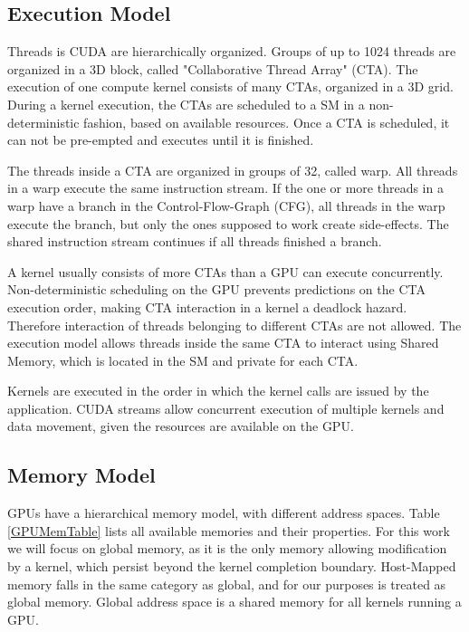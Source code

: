 \subsection{Execution Model}
Threads is CUDA are hierarchically organized. Groups of up to 1024 threads are organized in a 3D block, called "Collaborative Thread Array" (CTA). The execution of one compute kernel consists of many CTAs, organized in a 3D grid. During a kernel execution, the CTAs are  scheduled to a SM in a non-deterministic fashion, based on available resources. Once a CTA is scheduled, it can not be pre-empted and executes until it is finished.  \cite[2.1 - 2.2]{cuda-man}

The threads inside a CTA are organized in groups of 32, called warp. All threads in a warp execute the same instruction stream. If the one or more threads in a warp have a branch in the Control-Flow-Graph (CFG), all threads in the warp
execute the branch, but only the ones supposed to work create side-effects. The shared instruction stream continues if all threads finished a branch. \cite[4.1]{cuda-man}

A kernel usually consists of more CTAs than a GPU can execute concurrently. Non-deterministic scheduling on the GPU  prevents predictions on the CTA execution order, making CTA interaction
in a kernel a deadlock hazard. Therefore interaction of threads belonging to different CTAs are not allowed. The execution model allows threads inside the same CTA to interact using Shared Memory, which is located in the SM and private for each CTA. \cite[5]{cuda-man}

Kernels are executed in the order in which the kernel calls are issued by the application. CUDA streams allow concurrent  execution of multiple kernels and data movement, given the resources are available on the GPU. \cite[5]{cuda-man}

\subsection{Memory Model}
GPUs have a hierarchical memory model, with different address spaces. Table \ref{GPUMemTable} lists all available memories and their properties. For this work we will focus on global memory, as it is the only 
memory allowing modification by a kernel, which persist beyond the kernel completion boundary.
Host-Mapped memory falls in the same category as global, and for our purposes is treated as global memory. 
Global address space is a shared memory for all kernels running a GPU.


